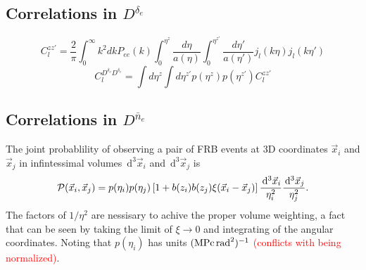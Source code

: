 \documentclass[onecolumn,prd,noshowpacs,nofootinbib,amsmath,amssymb]{revtex4}
\newcommand{\Dne}{D^{\bar{n}_e}}
\newcommand{\Dde}{D^{\delta_e}}
\newcommand{\calP}{{\cal P}}
\newcommand{\ud}{\,\mathrm{d}}
\newcommand{\red}{\textcolor{red}}
\begin{document}
\subsection{Correlations in $\Dde$}

\begin{equation}
C_l^{zz'}=\frac{2}{\pi} \int_0^{\infty}k^2 dk P_{ee}(k) \int_0^{\eta^z}\frac{d\eta}{a(\eta)} \int_0^{\eta^{z'}}\frac{d\eta'}{a(\eta')}  j_l(k\eta) j_l(k\eta')
\end{equation}
\begin{equation}
C_l^{\Dde \Dde} = \int d\eta^z \int d\eta^{z'} p(\eta^z)p(\eta^{z'}) C_l^{z z'}
\end{equation}


\subsection{Correlations in $\Dne$}

The joint probablility of observing a pair of FRB events at 3D coordinates
$\vec x_i$ and $\vec x_j$ in infintessimal volumes $\ud^3\vec x_i$ and
$\ud^3\vec x_j$ is
\begin{equation}
    \calP(\vec x_i, \vec x_j) = p(\eta_i) p(\eta_j) \left[ 1 + b(z_i)
    b(z_j) \xi(\vec x_i - \vec x_j) \right] \frac{\ud^3\vec x_i}{\eta_i^2}
    \frac{\ud^3\vec x_j}{\eta_j^2}.
\end{equation}
The factors of $1/\eta^2$ are nessisary to achive the proper volume weighting,
a fact that can be seen by taking the limit of $\xi \to 0$ and integrating of
the angular coordinates. Noting that $p(\eta_i)$ has units 
\red{$({\rm MPc}\,{\rm rad}^2)^{-1}$ (conflicts with being normalized)}.
\end{document}
